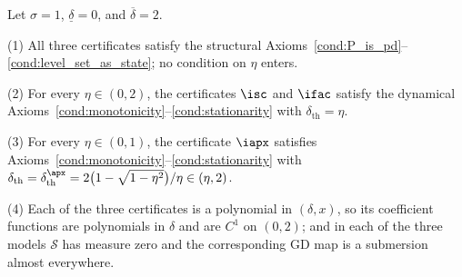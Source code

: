 \documentclass{article}
\begin{document}
\begin{lemma}
\label{lem:concrete_axioms}
Let $\sigma=1$, $\underline \delta = 0$, and $\overline\delta=2$.

(1) All three certificates satisfy the structural
Axioms~\ref{cond:P_is_pd}--\ref{cond:level_set_as_state}; no condition on
$\eta$ enters.

(2) For every $\eta\in(0,2)$, the certificates $\isc$ and $\ifac$ satisfy the
dynamical Axioms~\ref{cond:monotonicity}--\ref{cond:stationarity} with
$\delta_{\mathrm{th}}=\eta$.

(3) For every $\eta\in(0,1)$, the certificate $\iapx$ satisfies
Axioms~\ref{cond:monotonicity}--\ref{cond:stationarity} with
$\delta_{\mathrm{th}}=\delta_\mathrm{th}^\apx=2\bigl(1-\sqrt{1-\eta^2}\bigr)/\eta\in(\eta,2)$.

(4) Each of the three certificates is a polynomial in $(\delta,x)$, so its
coefficient functions are polynomials in $\delta$ and are $C^1$ on $(0,2)$;
and in each of the three models $\mathcal S$ has measure zero and the
corresponding GD map is a submersion almost everywhere.
\end{lemma}
\end{document}
